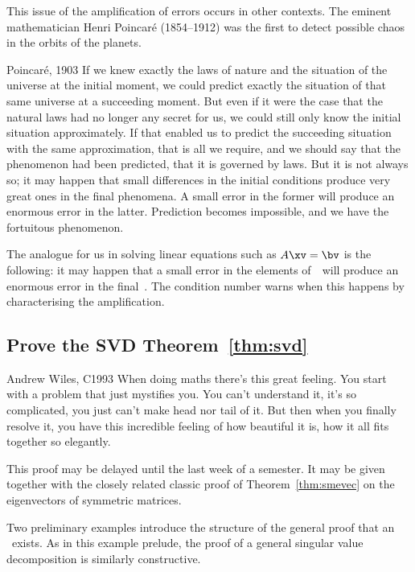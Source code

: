 This issue of the amplification of errors occurs in other contexts.
The eminent mathematician  Henri Poincar\'e (1854--1912) was the first to detect possible chaos in the orbits of the planets.
\begin{quoted}{Poincar\'e, 1903}
If we knew exactly the laws of nature and the situation of the universe at the initial moment, we could predict exactly the situation of that same universe at a succeeding moment.
But even if it were the case that the natural laws had no longer any secret for us, we could still only know the initial situation approximately. 
If that enabled us to predict the succeeding situation with the same approximation, that is all we require, and we should say that the phenomenon had been predicted, that it is governed by laws. 
But it is not always so; it may happen that small differences in the initial conditions produce very great ones in the final phenomena. 
A small error in the former will produce an enormous error in the latter. 
Prediction becomes impossible, and we have the fortuitous phenomenon.
\end{quoted}
The analogue for us in solving linear equations such as \(A\xv=\bv\) is the following: it may happen that a small error in the elements of~\bv\ will produce an enormous error in the final~\xv.
The condition number warns when this happens by characterising the amplification. 







\subsection{Prove the SVD Theorem~\ref{thm:svd}}
\label{sec:psvdt}


\begin{quoted}{Andrew Wiles, C1993}
When doing maths there's this great feeling.
You start with a problem that just mystifies you.
You can't understand it, it's so complicated, you just can't make head nor tail of it.
But then when you finally resolve it, you have this incredible feeling of how beautiful it is, how it all fits together so elegantly.
\end{quoted}


\begin{aside}
This proof may be delayed until the last week of a semester.
It may be given together with the closely related classic proof of Theorem~\ref{thm:smevec} on the eigenvectors of symmetric matrices.  
\end{aside}
Two preliminary examples introduce the structure of the general proof that an \svd\ exists.  
As in this example prelude, the proof of a general singular value decomposition is similarly constructive.

